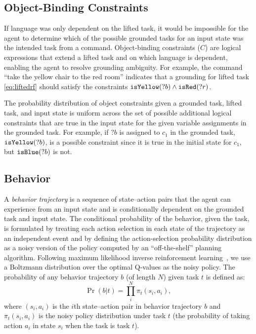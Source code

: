 \documentclass[conference]{IEEEtran}
\begin{document}
\subsection{Object-Binding Constraints}
If language was only dependent on the lifted task, it would be impossible for the agent to determine which of the possible grounded tasks for an input state was the intended task from a command.
Object-binding constraints ($C$) are logical expressions that extend a lifted task and on which language is dependent, enabling the agent to resolve grounding ambiguity. 
For example, the command ``take the yellow chair to the red room'' indicates that a grounding for lifted task \ref{eq:liftedrf} should satisfy the constraints ${\tt isYellow}(?b) \land {\tt isRed}(?r)$.

The probability distribution of object constraints given a grounded task, lifted task, and input state is uniform across the set of possible additional logical constraints that are true in the input state for the given variable assignments in the grounded task. For example, if $?b$ is assigned to $c_1$ in the grounded task, ${\tt isYellow}(?b)$, is a possible constraint since it is true in the initial state for $c_1$, but ${\tt isBlue}(?b)$ is not.

\subsection{Behavior}
A \emph{behavior trajectory} is a sequence of state--action pairs that the agent can experience from an input state and is conditionally dependent on the grounded task and input state. The conditional probability of the behavior, given the task, is formulated by treating each action selection in each state of the trajectory as an independent event and by defining the action-selection probability distribution as a noisy version of the policy computed by an ``off-the-shelf'' planning algorithm. Following maximum likelihood inverse reinforcement learning~\cite{babes11}, we use a Boltzmann distribution over the optimal Q-values as the noisy policy. The probability of any behavior trajectory $b$ (of length $N$) given task $t$ is defined as:
\begin{equation}
\label{eq:trajProb}
\Pr(b | t) = \prod^N_i \pi_t(s_i, a_i), 
\end{equation}
where $(s_i, a_i)$ is the $i$th state--action pair in behavior trajectory $b$ and $\pi_t(s_i, a_i)$ is the noisy policy distribution under task $t$ (the probability of taking action $a_i$ in state $s_i$ when the task is task $t$). 
\end{document}
